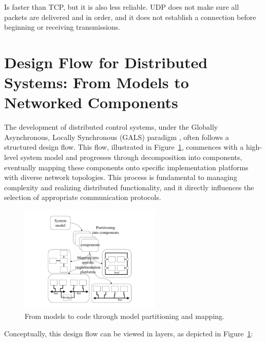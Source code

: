  Is faster than TCP, but it is also less reliable. UDP does not make sure all packets are delivered and in order, and it does not establish a connection before beginning or receiving transmissions.
 
 
 
 
 
 

\section{Design Flow for Distributed Systems: From Models to Networked Components }
\label{sec:design_flow}

The development of distributed control systems, under the Globally Asynchronous, Locally Synchronous (GALS) paradigm \cite{galsactd, galsborman}, often follows a structured design flow. This flow, illustrated in Figure~\ref{fig:model_to_code_mapping}, commences with a high-level system model and progresses through decomposition into components, eventually mapping these components onto specific implementation platforms with diverse network topologies. This process is fundamental to managing complexity and realizing distributed functionality, and it directly influences the selection of appropriate communication protocols.


\begin{figure}[htbp]
  \centering
 \includegraphics[width=0.6\textwidth]{Chapters/Figures/model_to_code_mapping.png}
  \caption{From models to code through model partitioning and mapping.}
  \label{fig:model_to_code_mapping}
\end{figure}

Conceptually, this design flow can be viewed in layers, as depicted in Figure~\ref{fig:model_to_code_mapping}:

